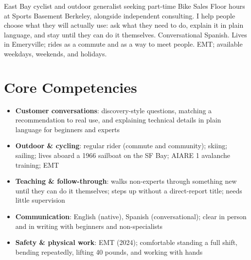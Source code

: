 \documentclass[11pt,a4paper,sans]{moderncv}
\begin{document}
\makecvtitle


\vspace{6pt}
\small{East Bay cyclist and outdoor generalist seeking part-time Bike Sales Floor hours at Sports Basement Berkeley, alongside independent consulting. I help people choose what they will actually use: ask what they need to do, explain it in plain language, and stay until they can do it themselves. Conversational Spanish. Lives in Emeryville; rides as a commute and as a way to meet people. EMT; available weekdays, weekends, and holidays.}


\section{Core Competencies}
\vspace{1pt}
\begin{itemize}

\item \textbf{Customer conversations}: discovery-style questions, matching a recommendation to real use, and explaining technical details in plain language for beginners and experts

\item \textbf{Outdoor \& cycling}: regular rider (commute and community); skiing; sailing; lives aboard a 1966 sailboat on the SF Bay; AIARE 1 avalanche training; EMT

\item \textbf{Teaching \& follow-through}: walks non-experts through something new until they can do it themselves; steps up without a direct-report title; needs little supervision

\item \textbf{Communication}: English (native), Spanish (conversational); clear in person and in writing with beginners and non-specialists

\item \textbf{Safety \& physical work}: EMT (2024); comfortable standing a full shift, bending repeatedly, lifting 40 pounds, and working with hands

\end{itemize}
\end{document}
